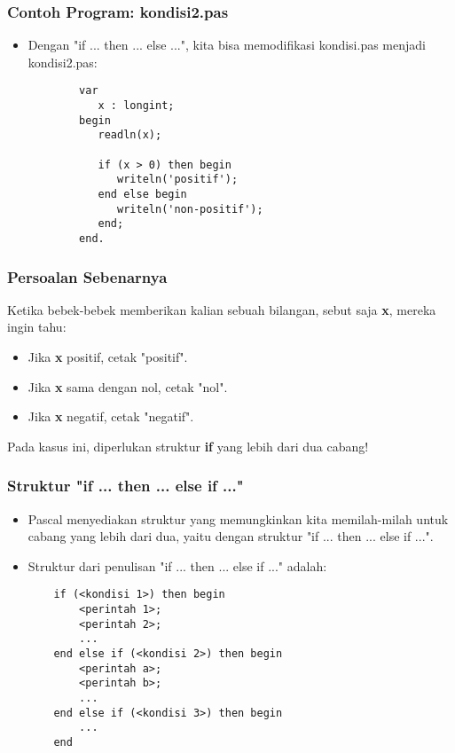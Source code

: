 \documentclass{beamer}
\begin{document}
\begin{frame}[fragile]
\frametitle{Contoh Program: kondisi2.pas}
\begin{itemize}
    \item Dengan "if ... then ... else ...", kita bisa memodifikasi kondisi.pas menjadi kondisi2.pas:
    \begin{lstlisting}
        var
           x : longint;
        begin
           readln(x);

           if (x > 0) then begin
              writeln('positif');
           end else begin
              writeln('non-positif');
           end;
        end.
    \end{lstlisting}
\end{itemize}
\end{frame}

\begin{frame}
\frametitle{Persoalan Sebenarnya}
Ketika bebek-bebek memberikan kalian sebuah bilangan, sebut saja \textbf{x}, mereka ingin tahu:
\begin{itemize}
    \item Jika \textbf{x} positif, cetak "positif".
    \item Jika \textbf{x} sama dengan nol, cetak "nol".
    \item Jika \textbf{x} negatif, cetak "negatif".
\end{itemize}

Pada kasus ini, diperlukan struktur \textbf{if} yang lebih dari dua cabang!
\end{frame}

\begin{frame}[fragile]
\frametitle{Struktur "if ... then ... else if ..."}
\begin{itemize}
    \item Pascal menyediakan struktur yang memungkinkan kita memilah-milah untuk cabang yang lebih dari dua, yaitu dengan struktur "if ... then ... else if ...".
    \item Struktur dari penulisan "if ... then ... else if ..." adalah:
    \begin{lstlisting}
    if (<kondisi 1>) then begin
        <perintah 1>;
        <perintah 2>;
        ...
    end else if (<kondisi 2>) then begin
        <perintah a>;
        <perintah b>;
        ...
    end else if (<kondisi 3>) then begin
        ...
    end
    \end{lstlisting}

\end{itemize}
\end{frame}
\end{document}
